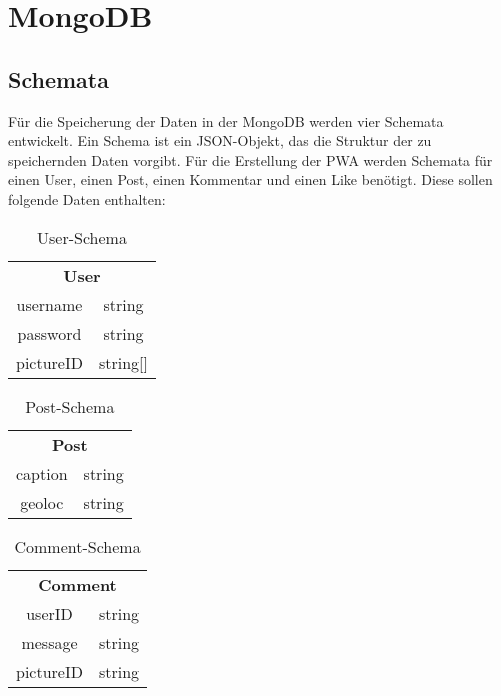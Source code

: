 \chapter{MongoDB}
\section{Schemata}
Für die Speicherung der Daten in der MongoDB werden vier Schemata entwickelt. Ein Schema ist ein JSON-Objekt, das die Struktur der zu speichernden Daten vorgibt. Für die Erstellung der PWA werden Schemata für einen User, einen Post, einen Kommentar und einen Like benötigt. Diese sollen folgende Daten enthalten:

\begin{table}[!htb]
\begin{tabularx}{\textwidth}{|c|c|}
    \cline{1-2}
    \multicolumn{2}{c}{\textbf{User}}\\
    \cline{1-2}
    username & string\\
    \cline{1-2}
    password & string\\
    \cline{1-2}
    pictureID & string[]\\
    \cline{1-2}
\end{tabularx}
\caption{User-Schema}
\label{userschema}
\end{table}


\begin{table}[!htb]
\begin{tabularx}{\textwidth}{|c|c|}
    \cline{1-2}
    \multicolumn{2}{c}{\textbf{Post}}\\
    \cline{1-2}
    caption & string\\
    \cline{1-2}
    geoloc & string\\
    \cline{1-2}
\end{tabularx}
\caption{Post-Schema}
\label{postschema}
\end{table}

\begin{table}[!htb]
\begin{tabularx}{\textwidth}{|c|c|}
    \cline{1-2}
    \multicolumn{2}{c}{\textbf{Comment}}\\
    \cline{1-2}
    userID & string\\
    \cline{1-2}
    message & string\\
    \cline{1-2}
    pictureID & string\\
    \cline{1-2}
\end{tabularx}
\caption{Comment-Schema}
\label{commentschema}
\end{table}

